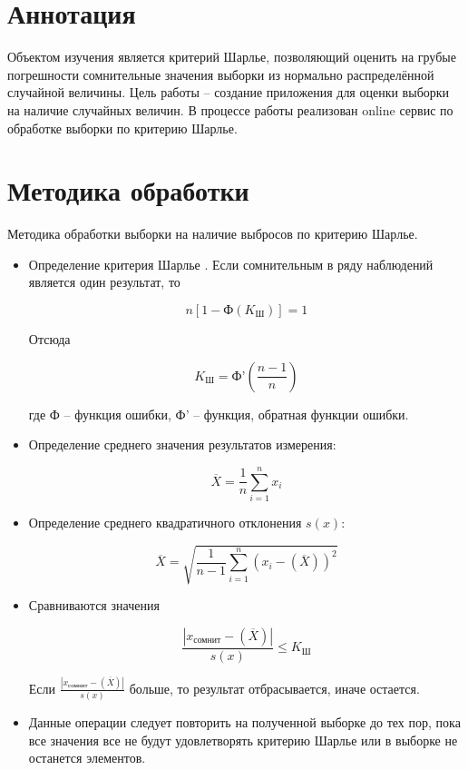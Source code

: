 \documentclass[a4paper,14pt]{article}
\begin{document}


\section{Аннотация}

Объектом изучения является критерий Шарлье, позволяющий оценить на грубые погрешности сомнительные значения выборки из нормально распределённой случайной величины. Цель работы -- создание приложения для оценки выборки на наличие случайных величин. В процессе работы реализован online сервис по обработке выборки по критерию Шарлье.


\section{Методика обработки}

Методика обработки выборки на наличие выбросов по критерию Шарлье.
\begin{itemize}
	\item Определение критерия Шарлье \cite{krSh}. Если сомнительным в ряду наблюдений является один результат, то
	
	$$n[1 - \text{Ф}(K_{\text{Ш}})] = 1$$
	
	Отсюда 
	
	$$K_{\text{Ш}} =  \text{Ф'}(\frac{n-1}{n})$$
	
	где  $\text{Ф}$ -- функция ошибки, $\text{Ф'}$ -- функция, обратная функции ошибки.
	
	\item Определение среднего значения результатов измерения:
	
	$$\overline{X} = \dfrac{1}{n}\sum_{i=1}^{n}x_i$$
	
	\item Определение среднего квадратичного отклонения $s(x)$:
	
	$$\overline{X} = \sqrt{\dfrac{1}{n-1}\sum_{i=1}^{n}(x_i - (\overline X))^2}$$
	
	\item Сравниваются значения \cite{zalaznih}
	
	$$\frac{|x_{\text{сомнит}} - (\overline X)|}{ s(x)} \leqslant K_{\text{Ш}}$$
	
	Если $\frac{|x_{\text{сомнит}} - (\overline X)|}{ s(x)}$ больше, то результат отбрасывается, иначе остается.
	
	\item Данные операции следует повторить на полученной выборке до тех пор, пока все значения все не будут удовлетворять критерию Шарлье или в выборке не останется элементов.
\end{itemize}
\end{document}
